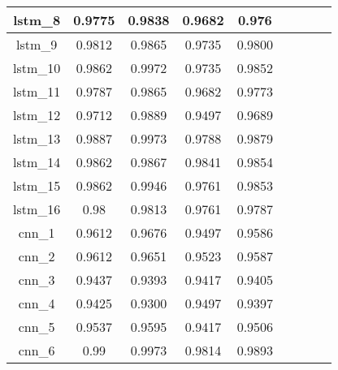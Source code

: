 \begin{table}[p]
\begin{tabular} {|c|c|c|c|c|c|c|c|c| }
        lstm\_8  & 0.9775                       & 0.9838                     & 0.9682                     & 0.976                      \\ \hline
        lstm\_9  & 0.9812                       & 0.9865                     & 0.9735                     & 0.9800                     \\ \hline
        lstm\_10 & 0.9862                       & 0.9972                     & 0.9735                     & 0.9852                     \\ \hline
        lstm\_11 & 0.9787                       & 0.9865                     & 0.9682                     & 0.9773                     \\ \hline
        lstm\_12 & 0.9712                       & 0.9889                     & 0.9497                     & 0.9689                     \\ \hline
        lstm\_13 & 0.9887                       & \cellcolor{green!50}0.9973 & 0.9788                     & 0.9879                     \\ \hline
        lstm\_14 & 0.9862                       & 0.9867                     & \cellcolor{green!50}0.9841 & 0.9854                     \\ \hline
        lstm\_15 & 0.9862                       & 0.9946                     & 0.9761                     & 0.9853                     \\ \hline
        lstm\_16 & 0.98                         & 0.9813                     & 0.9761                     & 0.9787                     \\ \hline
        cnn\_1   & 0.9612                       & 0.9676                     & 0.9497                     & 0.9586                     \\ \hline
        cnn\_2   & 0.9612                       & 0.9651                     & 0.9523                     & 0.9587                     \\ \hline
        cnn\_3   & 0.9437                       & 0.9393                     & 0.9417                     & 0.9405                     \\ \hline
        cnn\_4   & 0.9425                       & 0.9300                     & 0.9497                     & 0.9397                     \\ \hline
        cnn\_5   & 0.9537                       & 0.9595                     & 0.9417                     & 0.9506                     \\ \hline
        cnn\_6   & \cellcolor{green!50}0.99     & 0.9973                     & 0.9814                     & \cellcolor{green!50}0.9893 \\ \hline

\end{tabular}
\end{table}
